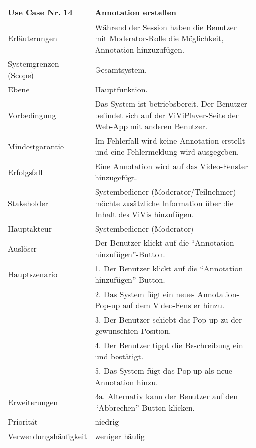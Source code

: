 \begin{tabularx}{\linewidth}{|l|X|}
	\hline
	Use Case Nr. 14			& \textbf{Annotation erstellen} \\ \hline
	Erläuterungen			& Während der Session haben die Benutzer mit Moderator-Rolle die 
							  Möglichkeit, Annotation hinzuzufügen. \\ \hline
	Systemgrenzen (Scope)	& Gesamtsystem. \\ \hline
	Ebene					& Hauptfunktion. \\ \hline
	Vorbedingung			& Das System ist betriebsbereit. Der Benutzer befindet sich auf 
							  der ViViPlayer-Seite der Web-App mit anderen Benutzer. \\ \hline
	Mindestgarantie			& Im Fehlerfall wird keine Annotation erstellt und eine 
							  Fehlermeldung wird ausgegeben. \\ \hline
	Erfolgsfall				& Eine Annotation wird auf das Video-Fenster hinzugefügt. \\ 
							  \hline
	Stakeholder				& Systembediener (Moderator/Teilnehmer) - möchte zusätzliche 
							  Information über die Inhalt des ViVis hinzufügen. \\ \hline
	Hauptakteur				& Systembediener (Moderator) \\ \hline
	Auslöser				& Der Benutzer klickt auf die ``Annotation hinzufügen''-Button. 
							  \\ \hline	
	Hauptszenario			& 1. Der Benutzer klickt auf die ``Annotation hinzufügen''-Button. 
							  \\
							& 2. Das System fügt ein neues Annotation-Pop-up auf dem 
							  Video-Fenster hinzu. \\
							& 3. Der Benutzer schiebt das Pop-up zu der gewünschten Position. \\
							& 4. Der Benutzer tippt die Beschreibung ein und bestätigt. \\
							& 5. Das System fügt das Pop-up als neue Annotation hinzu. \\ \hline
	Erweiterungen			& 3a. Alternativ kann der Benutzer auf den ``Abbrechen''-Button 
							 klicken. \\ \hline
	Priorität				& niedrig \\ \hline
	Verwendungshäufigkeit	& weniger häufig  \\ \hline
\end{tabularx}

